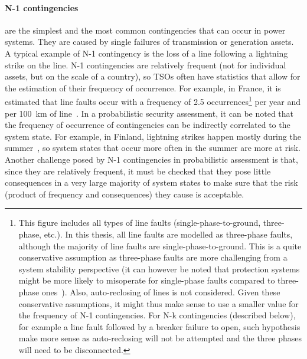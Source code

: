\paragraph*{N-1 contingencies} are the simplest and the most common contingencies that can occur in power systems. They are caused by single failures of transmission or generation assets. A typical example of N-1 contingency is the loss of a line following a lightning strike on the line. N-1 contingencies are relatively frequent (not for individual assets, but on the scale of a country), so TSOs often have statistics that allow for the estimation of their frequency of occurrence. For example, in France, it is estimated that line faults occur with a frequency of 2.5 occurrences\footnote{This figure includes all types of line faults (single-phase-to-ground, three-phase, etc.). In this thesis, all line faults are modelled as three-phase faults, although the majority of line faults are single-phase-to-ground. This is a quite conservative assumption as three-phase faults are more challenging from a system stability perspective (it can however be noted that protection systems might be more likely to misoperate for single-phase faults compared to three-phase ones~\cite{Alexandre_PMAPS}). Also, auto-reclosing of lines is not considered. Given these conservative assumptions, it might thus make sense to use a smaller value for the frequency of N-1 contingencies. For N-k contingencies (described below), for example a line fault followed by a breaker failure to open, such hypothesis make more sense as auto-reclosing will not be attempted and the three phases will need to be disconnected.} per year and per 100~km of line~\cite{FaultStatisticsFrance}. In a probabilistic security assessment, it can be noted that the frequency of occurrence of contingencies can be indirectly correlated to the system state. For example, in Finland, lightning strikes happen mostly during the summer~\cite{GridPSA}, so system states that occur more often in the summer are more at risk. Another challenge posed by N-1 contingencies in probabilistic assessment is that, since they are relatively frequent, it must be checked that they pose little consequences in a very large majority of system states to make sure that the risk (product of frequency and consequences) they cause is acceptable.


